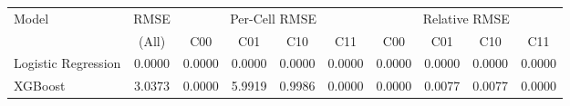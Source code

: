 \begin{tabular}{l c cccc cccc}
\toprule
Model & RMSE & \multicolumn{4}{c}{Per-Cell RMSE} & \multicolumn{4}{c}{Relative RMSE} \\
 & (All) & C00 & C01 & C10 & C11 & C00 & C01 & C10 & C11 \\
\midrule
Logistic Regression & 0.0000 & 0.0000 & 0.0000 & 0.0000 & 0.0000 & 0.0000 & 0.0000 & 0.0000 & 0.0000 \\
XGBoost & 3.0373 & 0.0000 & 5.9919 & 0.9986 & 0.0000 & 0.0000 & 0.0077 & 0.0077 & 0.0000 \\
\bottomrule
\end{tabular}
